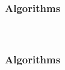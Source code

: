 
\begin{frame}[t]
	\frametitle{Algorithms}
	\framesubtitle{~~}  %

\end{frame}
\begin{frame}[t]
	\frametitle{Algorithms}
	\framesubtitle{~~}  %

\end{frame}


